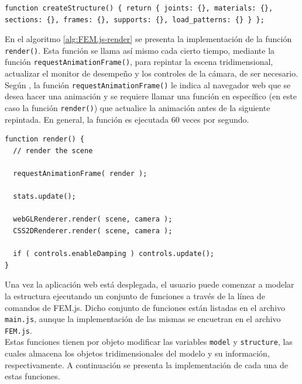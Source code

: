 \begin{lstlisting}[language={},caption=Implementación de la función \texttt{createStructure()} del archivo \texttt{FEM.js}.,label=alg:FEM.js-createStructure,frame=single]
function createStructure() { return { joints: {}, materials: {}, sections: {}, frames: {}, supports: {}, load_patterns: {} } };
\end{lstlisting}
\bigskip

En el algoritmo \ref{alg:FEM.js-render} se presenta la implementación de la función \verb|render()|. Esta función se llama así mismo cada cierto tiempo, mediante la función \verb|requestAnimationFrame()|, para repintar la escena tridimensional, actualizar el monitor de desempeño y los controles de la cámara, de ser necesario.\\

Según \cite{MDNWebDocs-requestAnimationFrame}, la función \verb|requestAnimationFrame()| le indica al navegador web que se desea hacer una animación y se requiere llamar una función en específico (en este caso la función \verb|render()|) que actualice la animación antes de la siguiente repintada. En general, la función es ejecutada 60 veces por segundo.\\

\begin{lstlisting}[language={},caption=Implementación de la función \texttt{render()} del archivo \texttt{FEM.js}.,label=alg:FEM.js-render,frame=single]
function render() {
  // render the scene

  requestAnimationFrame( render );

  stats.update();

  webGLRenderer.render( scene, camera );
  CSS2DRenderer.render( scene, camera );

  if ( controls.enableDamping ) controls.update();
}
\end{lstlisting}
\bigskip

Una vez la aplicación web está desplegada, el usuario puede comenzar a modelar la estructura ejecutando un conjunto de funciones a través de la línea de comandos de FEM.js. Dicho conjunto de funciones están listadas en el archivo \verb|main.js|, aunque la implementación de las mismas se encuetran en el archivo \verb|FEM.js|.\\

Estas funciones tienen por objeto modificar las variables \verb|model| y \verb|structure|, las cuales almacena los objetos tridimensionales del modelo y su información, respectivamente. A continuación se presenta la implementación de cada una de estas funciones.\\

